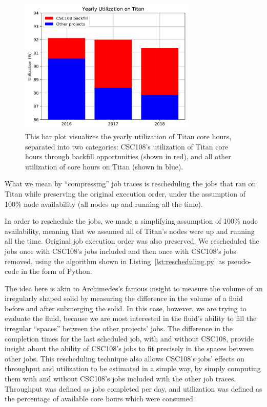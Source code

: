 \begin{figure}
  \includegraphics[width=0.75\textwidth]{images/barplot-jacks-slide.png}
\caption{This bar plot visualizes the yearly utilization of Titan core hours,
separated into two categories: CSC108's utilization of Titan core hours through
backfill opportunities (shown in red), and all other utilization of core hours
on Titan (shown in blue).}
\label{fig:jacks-slide}
\end{figure}

What we mean by ``compressing'' job traces is rescheduling the jobs that ran
on Titan while preserving the original execution order, under the assumption of
100\% node availability (all nodes up and running all the time). 

In order to reschedule the jobs, we made a simplifying assumption of 100\% node
availability, meaning that we assumed all of Titan's nodes were up and running
all the time. Original job execution order was also preserved. We rescheduled
the jobs once with CSC108's jobs included and then once with CSC108's jobs
removed, using the algorithm shown in Listing~\ref{lst:rescheduling.py} as
pseudo-code in the form of Python.

The idea here is akin to Archimedes's famous insight to measure the volume of
an irregularly shaped solid by measuring the difference in the volume of a
fluid before and after submerging the solid. In this case, however, we are
trying to evaluate the fluid, because we are most interested in the fluid's
ability to fill the irregular ``spaces'' between the other projects' jobs. The
difference in the completion times for the last scheduled job, with and without
CSC108, provide insight about the ability of CSC108's jobs to fit precisely
in the spaces between other jobs. This rescheduling technique also allows
CSC108's jobs' effects on throughput and utilization to be estimated in a
simple way, by simply computing them with and without CSC108's jobs included
with the other job traces. Throughput was defined as jobs completed per day,
and utilization was defined as the percentage of available core hours which
were consumed.

